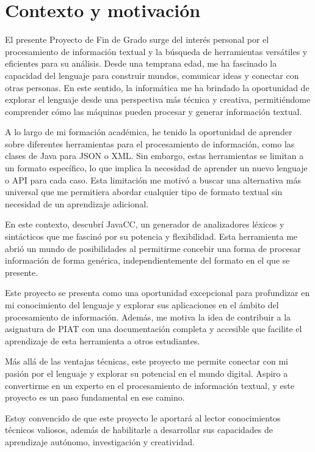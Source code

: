 \section{Contexto y motivación}
El presente Proyecto de Fin de Grado surge del interés personal por el procesamiento de información textual y la búsqueda de herramientas versátiles y eficientes para su análisis. Desde una temprana edad, me ha fascinado la capacidad del lenguaje para construir mundos, comunicar ideas y conectar con otras personas. En este sentido, la informática me ha brindado la oportunidad de explorar el lenguaje desde una perspectiva más técnica y creativa, permitiéndome comprender cómo las máquinas pueden procesar y generar información textual.

A lo largo de mi formación académica, he tenido la oportunidad de aprender sobre diferentes herramientas para el procesamiento de información, como las clases de Java para JSON o XML. Sin embargo, estas herramientas se limitan a un formato específico, lo que implica la necesidad de aprender un nuevo lenguaje o API para cada caso. Esta limitación me motivó a buscar una alternativa más universal que me permitiera abordar cualquier tipo de formato textual sin necesidad de un aprendizaje adicional.

En este contexto, descubrí JavaCC, un generador de analizadores léxicos y sintácticos que me fascinó por su potencia y flexibilidad\cite{javaccgithub}. Esta herramienta me abrió un mundo de posibilidades al permitirme concebir una forma de procesar información de forma genérica, independientemente del formato en el que se presente.

Este proyecto se presenta como una oportunidad excepcional para profundizar en mi conocimiento del lenguaje y explorar sus aplicaciones en el ámbito del procesamiento de información. Además, me motiva la idea de contribuir a la asignatura de PIAT con una documentación completa y accesible que facilite el aprendizaje de esta herramienta a otros estudiantes.

Más allá de las ventajas técnicas, este proyecto me permite conectar con mi pasión por el lenguaje y explorar su potencial en el mundo digital. Aspiro a convertirme en un experto en el procesamiento de información textual, y este proyecto es un paso fundamental en ese camino.

Estoy convencido de que este proyecto le aportará al lector conocimientos técnicos valiosos, además de habilitarle a desarrollar sus capacidades de aprendizaje autónomo, investigación y creatividad. 

